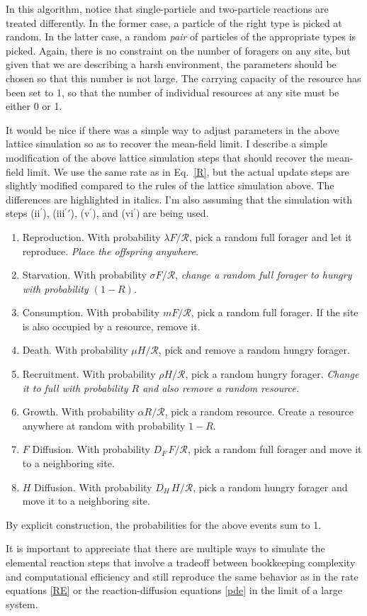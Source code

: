 \documentclass[11pt]{iopart}
\begin{document}
In this algorithm, notice that single-particle and two-particle reactions are
treated differently.  In the former case, a particle of the right type is
picked at random.  In the latter case, a random \emph{pair} of particles of
the appropriate types is picked.  Again, there is no constraint on the number
of foragers on any site, but given that we are describing a harsh
environment, the parameters should be chosen so that this number is not
large.  The carrying capacity of the resource has been set to 1, so that the
number of individual resources at any site must be either 0 or 1.

It would be nice if there was a simple way to adjust parameters in the above
lattice simulation so as to recover the mean-field limit.  I describe a
simple modification of the above lattice simulation steps that should recover
the mean-field limit.  We use the same rate as in Eq.~\eqref{R}, but the
actual update steps are slightly modified compared to the rules of the
lattice simulation above.  The differences are highlighted in italics.  I'm
also assuming that the simulation with steps (ii$^\prime$),
(iii$^\prime\prime$), (v$^\prime$), and (vi$^\prime$) are being used.
\begin{enumerate}
\item Reproduction.  With probability $\lambda F/\mathcal{R}$, pick a random
  full forager and let it reproduce.  \emph{Place the offspring anywhere.}
\item Starvation.  With probability $\sigma F/\mathcal{R}$, \emph{change a
    random full forager to hungry with probability $(1-R)$.}
\item Consumption.  With probability $m F/\mathcal{R}$, pick a random full
  forager.  If the site is also occupied by a resource, remove it.
\item Death.  With probability $\mu H/\mathcal{R}$, pick and remove a random
  hungry forager.
\item Recruitment.  With probability $\rho H/\mathcal{R}$, pick a random
  hungry forager. \emph{Change it to full with probability $R$ and also
    remove a random resource.}
\item Growth.  With probability $\alpha R/\mathcal{R}$, pick a random
  resource.  Create a resource anywhere at random with probability $1-R$.
\item $F$ Diffusion.  With probability $D_F\, F/\mathcal{R}$, pick a random full
  forager and move it to a neighboring site.
\item $H$ Diffusion.  With probability $D_H\, H/\mathcal{R}$, pick a random
  hungry forager and move it to a neighboring site.
\end{enumerate}
By explicit construction, the probabilities for the above events sum to 1.

It is important to appreciate that there are multiple ways to simulate the
elemental reaction steps that involve a tradeoff between bookkeeping
complexity and computational efficiency and still reproduce the same behavior
as in the rate equations \eqref{RE} or the reaction-diffusion equations
\eqref{pde} in the limit of a large system.
\end{document}
